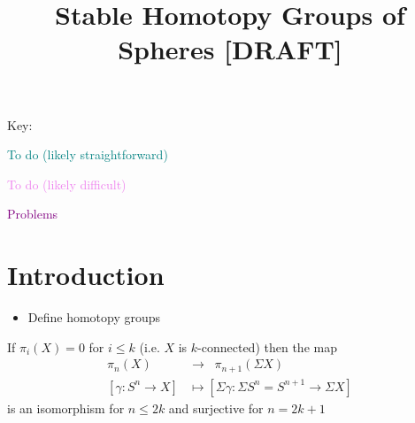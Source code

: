 \documentclass{MetricNotes2023}
\author{\vspace{-5ex}}
\title{Stable Homotopy Groups of Spheres  [DRAFT]}
\date{\vspace{-5ex}}
\def\textcolour{\textcolor}
\begin{document}
\maketitle
%

\DeclarePairedDelimiter{\norm}{\lVert}{\rVert} 
\DeclarePairedDelimiter{\abs}{\lvert}{\rvert} 
\DeclarePairedDelimiter{\ang}{\langle}{\rangle} 

\tableofcontents

\pagebreak

Key:

\textcolour{teal}{To do (likely straightforward)}

\textcolour{violet}{To do (likely difficult)}

\textcolour{purple}{Problems}

\section{Introduction}

\begin{itemize}
\item Define homotopy groups
\end{itemize}

\begin{theorem}\label{2504151046}
If \(\pi_i(X)=0\) for \(i\leq k\) (i.e. \(X\) is \(k\)-connected) then the map 
\begin{align*}
\pi_n(X) \;\;&\to\;\; \pi_{n+1}(\Sigma X)\\
[\gamma : S^n \to X] &\mapsto [\Sigma \gamma : \Sigma S^n=S^{n+1} \to \Sigma X]
\end{align*}
is an isomorphism for \(n \leq 2k\) and surjective for \(n=2k+1\)
\end{theorem}
\end{document}
